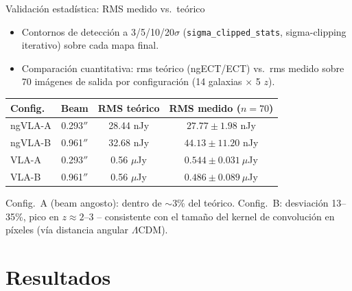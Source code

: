 \documentclass[12pt,aspectratio=169]{beamer}
\begin{document}
\begin{frame}{Validación estadística: RMS medido vs.\ teórico}
    \begin{itemize}
        \item Contornos de detección a 3/5/10/20$\sigma$
        (\texttt{sigma\_clipped\_stats}, sigma-clipping iterativo) sobre
        cada mapa final.
        \item Comparación cuantitativa: rms teórico (ngECT/ECT) vs.\ rms
        medido sobre 70 imágenes de salida por configuración (14 galaxias
        $\times$ 5 $z$).
    \end{itemize}
    \begin{center}
    \small
    \begin{tabular}{lccc}
    \toprule
    Config. & Beam & RMS teórico & RMS medido ($n=70$) \\
    \midrule
    ngVLA-A & 0.293$''$ & 28.44 nJy & $27.77\pm1.98$ nJy \\
    ngVLA-B & 0.961$''$ & 32.68 nJy & $44.13\pm11.20$ nJy \\
    VLA-A   & 0.293$''$ & 0.56 $\mu$Jy & $0.544\pm0.031\ \mu$Jy \\
    VLA-B   & 0.961$''$ & 0.56 $\mu$Jy & $0.486\pm0.089\ \mu$Jy \\
    \bottomrule
    \end{tabular}
    \end{center}
    \small Config.\ A (beam angosto): dentro de $\sim$3\% del teórico.
    Config.\ B: desviación 13--35\%, pico en $z\approx2$--3 -- consistente
    con el tamaño del kernel de convolución en píxeles (vía distancia
    angular $\Lambda$CDM).
\end{frame}

\section{Resultados}
\end{document}
